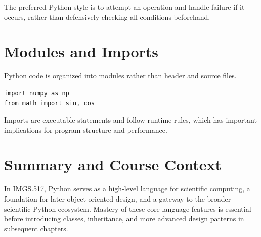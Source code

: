 The preferred Python style is to attempt an operation and handle failure if it occurs, rather than defensively checking all conditions beforehand.

\section{Modules and Imports}

Python code is organized into modules rather than header and source files.

\begin{verbatim}
import numpy as np
from math import sin, cos
\end{verbatim}

Imports are executable statements and follow runtime rules, which has important implications for program structure and performance.

\section{Summary and Course Context}

In IMGS.517, Python serves as a high-level language for scientific computing, a foundation for later object-oriented design, and a gateway to the broader scientific Python ecosystem. Mastery of these core language features is essential before introducing classes, inheritance, and more advanced design patterns in subsequent chapters.
